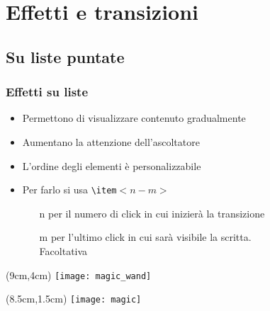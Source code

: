 \section{Effetti e transizioni}
\subsection{Su liste puntate}
\begin{frame}
  \frametitle{Effetti su liste}
  
  \begin{itemize}
   \item<1-3> Permettono di visualizzare contenuto gradualmente
   \item<2-> Aumentano la attenzione dell'ascoltatore
   \item<4-> L'ordine degli elementi è personalizzabile
   \item<3-> Per farlo si usa \texttt{\textbackslash item}$<n - m>$
   \begin{itemize}
    \item[n] per il numero di click in cui inizierà la transizione
    \item[m] per l'ultimo click in cui sarà visibile la scritta. \\ Facoltativa
   \end{itemize}

  \end{itemize}
  
  
 \begin{textblock*}{5cm}(9cm,4cm)
    \texttt{[image: magic\_wand]}
  \end{textblock*}
  
  
 \begin{textblock*}{5cm}(8.5cm,1.5cm)
    \texttt{[image: magic]}
  \end{textblock*}

\end{frame}
 
